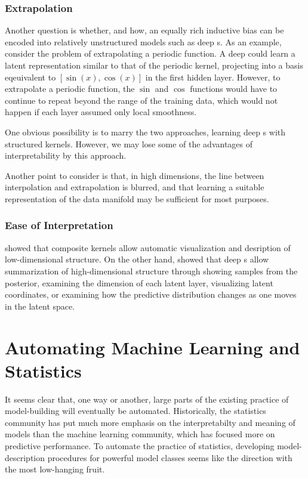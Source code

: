 \subsubsection{Extrapolation}
Another question is whether, and how, an equally rich inductive bias can be encoded into relatively unstructured models such as deep \gp{}s.
As an example, consider the problem of extrapolating a periodic function.
A deep \gp{} could learn a latent representation similar to that of the periodic kernel, projecting into a basis eqeuivalent to $[\sin(x), \cos(x)]$ in the first hidden layer.
However, to extrapolate a periodic function, the $\sin$ and $\cos$ functions would have to continue to repeat beyond the range of the training data, which would not happen if each layer assumed only local smoothness.

One obvious possibility is to marry the two approaches, learning deep \gp{}s with structured kernels.
However, we may lose some of the advantages of interpretability by this approach.

Another point to consider is that, in high dimensions, the line between interpolation and extrapolation is blurred, and that learning a suitable representation of the data manifold may be sufficient for most purposes.

\subsubsection{Ease of Interpretation}
 showed that composite kernels allow automatic visualization and desription of low-dimensional structure.
On the other hand, \citet{damianou2012deep} showed that deep \gplvm{}s allow summarization of high-dimensional structure through showing samples from the posterior, examining the dimension of each latent layer, visualizing latent coordinates, or examining how the predictive distribution changes as one moves in the latent space.

\section{Automating Machine Learning and Statistics}

It seems clear that, one way or another, large parts of the existing practice of model-building will eventually be automated.
Historically, the statistics community has put much more emphasis on the interpretabilty and meaning of models than the machine learning community, which has focused more on predictive performance.
To automate the practice of statistics, developing model-description procedures for powerful model classes seems like the direction with the most low-hanging fruit.




